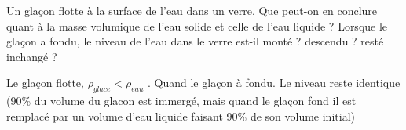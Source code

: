 \begin{Exercise}[title=Apéro]
		Un glaçon flotte à la surface de l’eau dans un verre. Que peut-on en conclure quant à la masse volumique de l’eau solide et celle de l’eau liquide ? Lorsque le glaçon a fondu, le niveau de l’eau
		dans le verre est-il monté ? descendu ? resté inchangé ?
\end{Exercise}
\begin{Answer}
		Le glaçon flotte, $\rho_{glace} < \rho_{eau}$ . Quand le glaçon à fondu. Le niveau reste identique (90\% du volume du glacon est immergé, mais quand le glaçon fond il est remplacé par un  volume d'eau liquide faisant 90\% de son volume initial)
\end{Answer}
